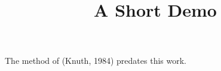 \documentclass[article]{jss}
\title{A Short Demo}
\begin{document}
The method of (Knuth, 1984) predates this work.
\end{document}
